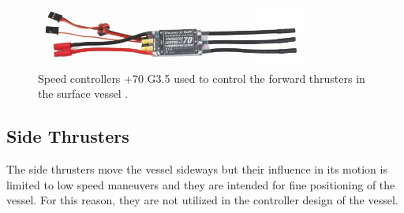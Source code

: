 \begin{figure}[H]
    \includegraphics[width=0.8\textwidth]{figures/ESC}
    \caption{Speed controllers +70 G\num{3,5} used to control the forward thrusters in the surface vessel \cite{ESC}.}
    \label{fig:ESC}
\end{figure}

\subsection{Side Thrusters}
The side thrusters move the vessel sideways but their influence in its motion is limited to low speed maneuvers and they are intended for fine positioning of the vessel. For this reason, they are not utilized in the controller design of the vessel.
